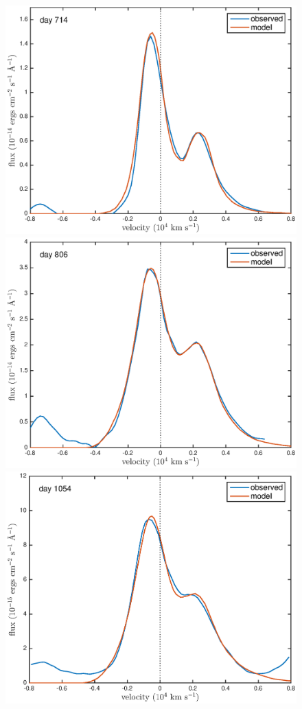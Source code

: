 \documentclass[useAMS,usenatbib,usegraphicx]{mnras}
\begin{document}
\begin{figure}
\begin{center}
\includegraphics[trim =33 10 45 15,clip=true,scale=0.41]{clump_1/maximum/d714OI}
\includegraphics[trim =33 10 45 15,clip=true,scale=0.41]{clump_1/maximum/d806OI}
\includegraphics[trim =33 10 45 15,clip=true,scale=0.41]{clump_1/maximum/d1054OI}

\end{center}
\end{figure}
\end{document}
